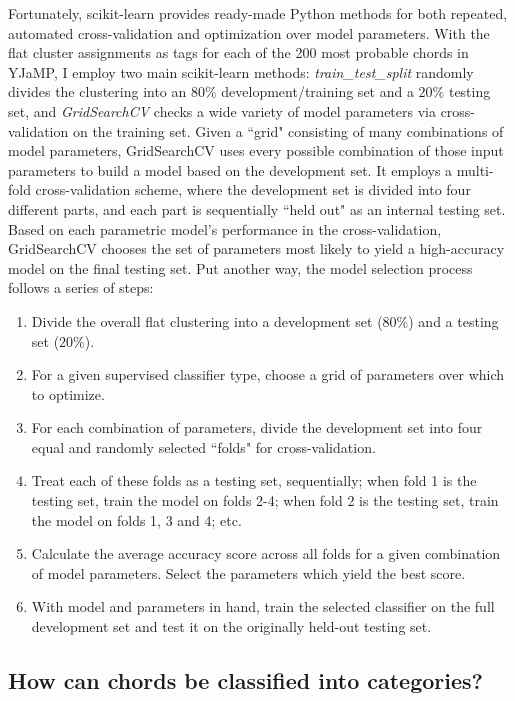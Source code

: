 Fortunately, scikit-learn provides ready-made Python methods for both repeated, automated cross-validation and optimization over model parameters.  With the flat cluster assignments as tags for each of the 200 most probable chords in YJaMP, I employ two main scikit-learn methods: \emph{train\_test\_split} randomly divides the clustering into an $80\%$ development/training set and a $20\%$ testing set, and \emph{GridSearchCV} checks a wide variety of model parameters via cross-validation on the training set.  Given a ``grid" consisting of many combinations of model parameters, GridSearchCV uses every possible combination of those input parameters to build a model based on the development set.  It employs a multi-fold cross-validation scheme, where the development set is divided into four different parts, and each part is sequentially ``held out" as an internal testing set.  Based on each parametric model's performance in the cross-validation, GridSearchCV chooses the set of parameters most likely to yield a high-accuracy model on the final testing set.  Put another way, the model selection process follows a series of steps:

\begin{enumerate}
	\item Divide the overall flat clustering into a development set ($80\%$) and a testing set ($20\%$).
	\item For a given supervised classifier type, choose a grid of parameters over which to optimize.
	\item For each combination of parameters, divide the development set into four equal and randomly selected ``folds" for cross-validation.
	\item Treat each of these folds as a testing set, sequentially; when fold 1 is the testing set, train the model on folds 2-4; when fold 2 is the testing set, train the model on folds 1, 3 and 4; etc.
	\item Calculate the average accuracy score across all folds for a given combination of model parameters.  Select the parameters which yield the best score.
	\item With model and parameters in hand, train the selected classifier on the full development set and test it on the originally held-out testing set.
\end{enumerate}

\subsection{How can chords be classified into categories?}


